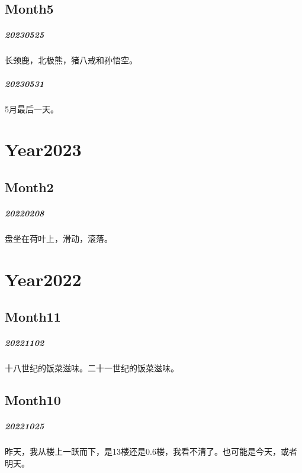 \documentclass[UTF8]{Diaries}
\begin{document}
\section{Month5}

\paragraph{20230525}
长颈鹿，北极熊，猪八戒和孙悟空。

\paragraph{20230531}
5月最后一天。



\chapter{Year2023}
\section{Month2}
\paragraph{20220208}

盘坐在荷叶上，滑动，滚落。




\chapter{Year2022}


\section{Month11}
\paragraph{20221102}
十八世纪的饭菜滋味。二十一世纪的饭菜滋味。

\section{Month10}

\paragraph{20221025}
昨天，我从楼上一跃而下，是13楼还是0.6楼，我看不清了。也可能是今天，或者明天。
\end{document}
